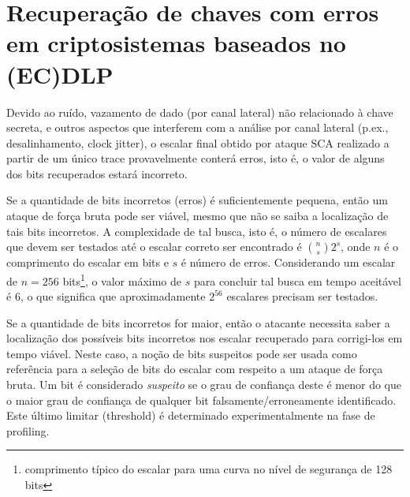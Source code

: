 
\section{Recuperação de chaves com erros em criptosistemas baseados no (EC)DLP}

%
Devido ao ruído, vazamento de dado (por canal lateral) não relacionado à chave secreta, e outros aspectos que interferem com a análise por canal lateral (p.ex., desalinhamento, clock jitter), o escalar final obtido por ataque SCA realizado a partir de um único trace provavelmente conterá erros, isto é, o valor de alguns dos bits recuperados estará incorreto.

%
%
Se a quantidade de bits incorretos (erros) é suficientemente pequena, então um ataque de força bruta pode ser viável, mesmo que não se saiba a localização de tais bits incorretos. A complexidade de tal busca, isto é, o número de escalares que devem ser testados até o escalar correto ser encontrado é ${{n}\choose{s}} 2^s$, onde $n$ é o comprimento do escalar em bits e $s$ é número de erros. Considerando um escalar de $n = 256$ bits\footnote{comprimento típico do escalar para uma curva no nível de segurança de 128 bits}, o valor máximo de $s$ para concluir tal busca em tempo aceitável é 6, o que significa que aproximadamente $2^{56}$ escalares precisam ser testados.

%
%
Se a quantidade de bits incorretos for maior, então o atacante necessita saber a localização dos possíveis bits incorretos nos escalar recuperado para corrigi-los em tempo viável.
%
%
Neste caso, a noção de bits suspeitos pode ser usada como referência para a seleção de bits do escalar com respeito a um ataque de força bruta. Um bit é considerado \textit{suspeito} se o grau de confiança deste é menor do que o maior grau de confiança de qualquer bit falsamente/erroneamente identificado. Este último limitar (threshold) é determinado experimentalmente na fase de profiling.
%

